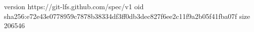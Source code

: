 version https://git-lfs.github.com/spec/v1
oid sha256:e72e43e0778959c7878b38334df3ff0db3dec827f6ee2c11f9a2b05f41fba07f
size 206546
